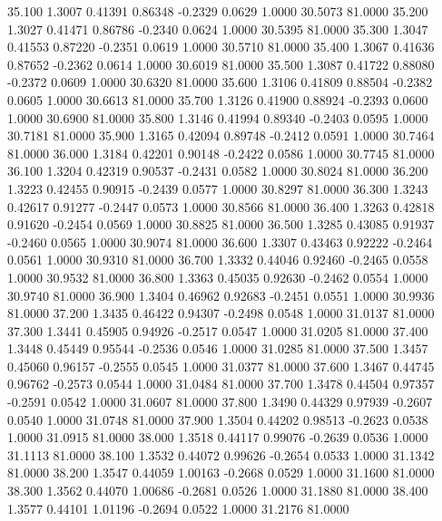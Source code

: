   35.100   1.3007   0.41391   0.86348  -0.2329   0.0629   1.0000  30.5073  81.0000
  35.200   1.3027   0.41471   0.86786  -0.2340   0.0624   1.0000  30.5395  81.0000
  35.300   1.3047   0.41553   0.87220  -0.2351   0.0619   1.0000  30.5710  81.0000
  35.400   1.3067   0.41636   0.87652  -0.2362   0.0614   1.0000  30.6019  81.0000
  35.500   1.3087   0.41722   0.88080  -0.2372   0.0609   1.0000  30.6320  81.0000
  35.600   1.3106   0.41809   0.88504  -0.2382   0.0605   1.0000  30.6613  81.0000
  35.700   1.3126   0.41900   0.88924  -0.2393   0.0600   1.0000  30.6900  81.0000
  35.800   1.3146   0.41994   0.89340  -0.2403   0.0595   1.0000  30.7181  81.0000
  35.900   1.3165   0.42094   0.89748  -0.2412   0.0591   1.0000  30.7464  81.0000
  36.000   1.3184   0.42201   0.90148  -0.2422   0.0586   1.0000  30.7745  81.0000
  36.100   1.3204   0.42319   0.90537  -0.2431   0.0582   1.0000  30.8024  81.0000
  36.200   1.3223   0.42455   0.90915  -0.2439   0.0577   1.0000  30.8297  81.0000
  36.300   1.3243   0.42617   0.91277  -0.2447   0.0573   1.0000  30.8566  81.0000
  36.400   1.3263   0.42818   0.91620  -0.2454   0.0569   1.0000  30.8825  81.0000
  36.500   1.3285   0.43085   0.91937  -0.2460   0.0565   1.0000  30.9074  81.0000
  36.600   1.3307   0.43463   0.92222  -0.2464   0.0561   1.0000  30.9310  81.0000
  36.700   1.3332   0.44046   0.92460  -0.2465   0.0558   1.0000  30.9532  81.0000
  36.800   1.3363   0.45035   0.92630  -0.2462   0.0554   1.0000  30.9740  81.0000
  36.900   1.3404   0.46962   0.92683  -0.2451   0.0551   1.0000  30.9936  81.0000
  37.200   1.3435   0.46422   0.94307  -0.2498   0.0548   1.0000  31.0137  81.0000
  37.300   1.3441   0.45905   0.94926  -0.2517   0.0547   1.0000  31.0205  81.0000
  37.400   1.3448   0.45449   0.95544  -0.2536   0.0546   1.0000  31.0285  81.0000
  37.500   1.3457   0.45060   0.96157  -0.2555   0.0545   1.0000  31.0377  81.0000
  37.600   1.3467   0.44745   0.96762  -0.2573   0.0544   1.0000  31.0484  81.0000
  37.700   1.3478   0.44504   0.97357  -0.2591   0.0542   1.0000  31.0607  81.0000
  37.800   1.3490   0.44329   0.97939  -0.2607   0.0540   1.0000  31.0748  81.0000
  37.900   1.3504   0.44202   0.98513  -0.2623   0.0538   1.0000  31.0915  81.0000
  38.000   1.3518   0.44117   0.99076  -0.2639   0.0536   1.0000  31.1113  81.0000
  38.100   1.3532   0.44072   0.99626  -0.2654   0.0533   1.0000  31.1342  81.0000
  38.200   1.3547   0.44059   1.00163  -0.2668   0.0529   1.0000  31.1600  81.0000
  38.300   1.3562   0.44070   1.00686  -0.2681   0.0526   1.0000  31.1880  81.0000
  38.400   1.3577   0.44101   1.01196  -0.2694   0.0522   1.0000  31.2176  81.0000
